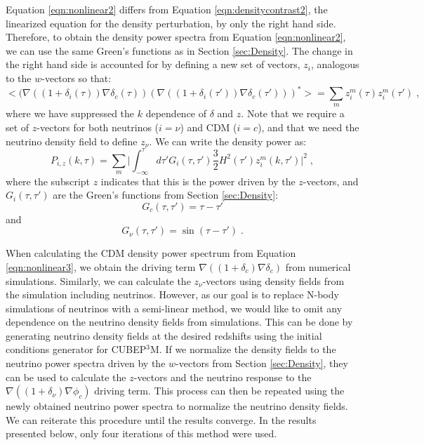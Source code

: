 \documentclass{aastex}
\begin{document}
Equation \eqref{eqn:nonlinear2} differs from Equation
\eqref{eqn:densitycontrast2}, the linearized equation for the density
perturbation, by only the right hand side. 
Therefore, to obtain the density power
spectra from Equation \eqref{eqn:nonlinear2}, we can use the same Green's functions as
in Section \ref{sec:Density}.  The change in the right hand side is
accounted for by defining a new set of vectors, $z_i$, analogous
to the $w$-vectors so that:
\begin{equation}
  <(\nabla ((1 + \delta_i(\tau)) \nabla \delta_c(\tau)) (\nabla
  ((1+\delta_i(\tau')) \nabla \delta_c(\tau')))^*> = \sum_m
  z_i^m(\tau) z_i^m(\tau')\;,
\end{equation}
where we have suppressed the $k$ dependence of $\delta$ and $z$.  
Note that we require a set of $z$-vectors for both neutrinos ($i=\nu$) and
CDM ($i=c$), and that we need the neutrino density
field to define $z_\nu$.
We can write the density power as:
\begin{equation}\label{eqn:nonlinear3}
  P_{i,z}(k,\tau) = \sum_m \bigg| \int_{-\infty}^\tau d\tau' G_i(\tau,\tau')
  \frac{3}{2} H^2(\tau') z_i^m(k, \tau') \bigg|^2\;,
\end{equation} 
where the subscript $z$ indicates that this is the power driven by the
$z$-vectors, and $G_i(\tau, \tau')$ are the Green's functions from Section
\ref{sec:Density}:
\begin{equation}
  G_c(\tau,\tau') = \tau-\tau'
\end{equation}
and
\begin{equation}
  G_\nu(\tau,\tau') = \sin( \tau-\tau')\;.
\end{equation}

When calculating the CDM density power spectrum from
Equation \eqref{eqn:nonlinear3}, we obtain the driving term
$\nabla((1+\delta_c)\nabla\delta_c)$ 
from numerical simulations.  
Similarly, we can calculate the $z_\nu$-vectors using density
fields from the simulation including neutrinos.
However, as our goal is to replace
N-body simulations of neutrinos with a semi-linear method, we would
like to omit any dependence on the neutrino density fields from
simulations.  This can be done by generating %
neutrino density fields
at the desired redshifts
using the initial conditions generator for CUBEP$^3$M. If we normalize
the density
fields
to the neutrino power spectra driven by the $w$-vectors 
from Section \ref{sec:Density}, 
they can be used to calculate the
$z$-vectors and the neutrino response to the $\nabla ((1+\delta_\nu)
\nabla \phi_c)$ driving term.  This
process can then be repeated using the newly obtained neutrino
power spectra to normalize the neutrino density fields.  We can
reiterate this procedure until the results converge.  In the results presented
below, only four iterations of this method were used.
\end{document}
